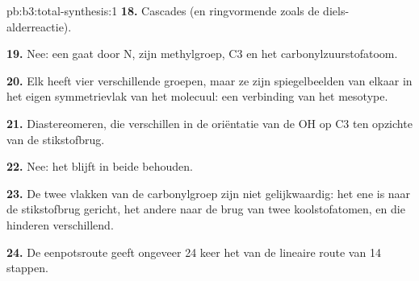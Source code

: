 \begin{solution}{pb:b3:total-synthesis:1}
\textbf{18.} Cascades (en ringvormende  zoals de
diels-alderreactie).

\textbf{19.} Nee: een  gaat door N, zijn methylgroep, C3 en het
carbonylzuurstofatoom.

\textbf{20.} Elk heeft vier verschillende groepen, maar ze zijn
spiegelbeelden van elkaar in het eigen symmetrievlak van het molecuul:
een verbinding van het mesotype.

\textbf{21.} Diastereomeren, die verschillen in de oriëntatie van de OH op
C3 ten opzichte van de stikstofbrug.

\textbf{22.} Nee: het  blijft in beide behouden.

\textbf{23.} De twee vlakken van de carbonylgroep zijn niet gelijkwaardig:
het ene is naar de stikstofbrug gericht, het andere naar de brug van
twee koolstofatomen, en die hinderen verschillend.

\textbf{24.} De eenpotsroute geeft ongeveer 24 keer het  van de lineaire route
van 14 stappen.
\end{solution}
